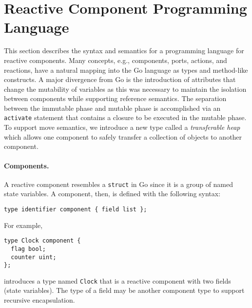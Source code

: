 
\section{Reactive Component Programming Language}

This section describes the syntax and semantics for a programming language for reactive components.
Many concepts, e.g., components, ports, actions, and reactions, have a natural mapping into the Go language as types and method-like constructs.
A major divergence from Go is the introduction of attributes that change the mutability of variables as this was necessary to maintain the isolation between components while supporting reference semantics.
The separation between the immutable phase and mutable phase is accomplished via an \verb+activate+ statement that contains a closure to be executed in the mutable phase.
To support move semantics, we introduce a new type called a \emph{transferable heap} which allows one component to safely transfer a collection of objects to another component.

\paragraph{Components.}
A reactive component resembles a \verb+struct+ in Go since it is a group of named state variables.
A component, then, is defined with the following syntax:
\begin{verbatim}
type identifier component { field list };
\end{verbatim}
For example,
\begin{verbatim}
type Clock component {
  flag bool;
  counter uint;
};
\end{verbatim}
introduces a type named \verb+Clock+ that is a reactive component with two fields (state variables).
The type of a field may be another component type to support recursive encapsulation.

